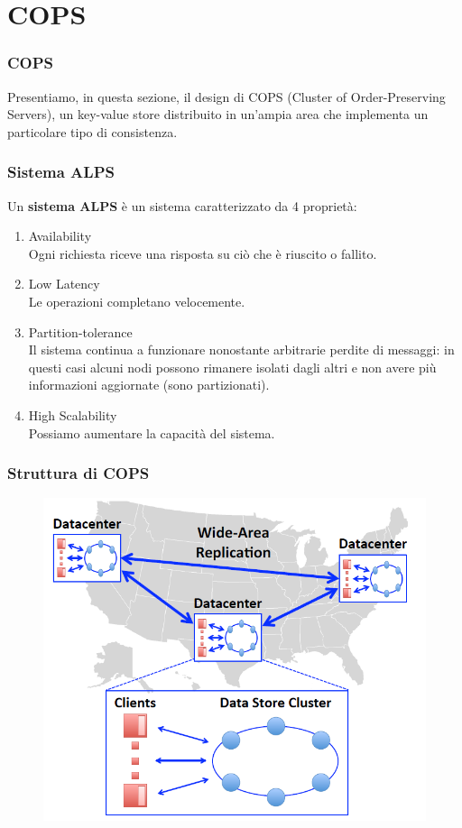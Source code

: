 \section{COPS}
\begin{frame}
\frametitle{COPS}
Presentiamo, in questa sezione, il design di COPS (Cluster of Order-Preserving Servers),
un key-value store distribuito in un'ampia area che implementa un particolare tipo di consistenza.
\end{frame}

\begin{frame}
\frametitle{Sistema ALPS}
	\begin{definizione}
	Un \textbf{sistema ALPS} è un sistema caratterizzato da 4 proprietà:
	\begin{enumerate}
		\item<1-> Availability \\
				  Ogni richiesta riceve una risposta su ciò che è riuscito o fallito.
		\item<1-> Low Latency \\
				  Le operazioni completano velocemente.
		\item<1-> Partition-tolerance \\
				  Il sistema continua a funzionare nonostante arbitrarie perdite di messaggi:
				  in questi casi alcuni nodi possono rimanere isolati dagli altri e non avere
				  più informazioni aggiornate (sono partizionati).
		\item<1-> High Scalability \\
				  Possiamo aumentare la capacità del sistema.
	\end{enumerate}
	\end{definizione}
\end{frame}

\begin{frame}
\frametitle{Struttura di COPS}
	\begin{figure}
		\centering
		\includegraphics[scale=0.45]{COPS/COPS1.png}
	\end{figure}
\end{frame}

